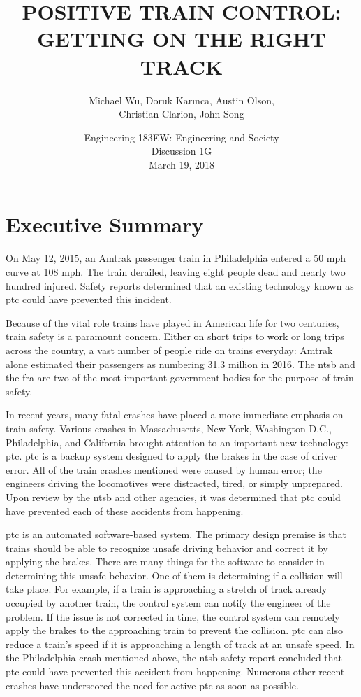 \documentclass[11pt, titlepage]{article}
\title{POSITIVE TRAIN CONTROL: GETTING ON THE RIGHT TRACK}
\author{Michael Wu, Doruk Karınca, Austin Olson,\\Christian Clarion, John Song}
\date{Engineering 183EW: Engineering and Society \\ Discussion 1G \\ March 19, 2018}
\newcommand\frontmatter{
    \cleardoublepage
  \pagenumbering{roman}}
\newcommand\mainmatter{
    \cleardoublepage
  \pagenumbering{arabic}}
\begin{document}
\maketitle

\frontmatter
\tableofcontents
\listoffigures
\listoftables

\mainmatter
\section{Executive Summary}

On May 12, 2015, an Amtrak passenger train in Philadelphia entered a 50 mph
curve at 108 mph. The train derailed, leaving eight people dead and nearly two
hundred injured. Safety reports determined that an existing technology known
as \gls{ptc} could have prevented this incident.

Because of the vital role trains have played in American life for two
centuries, train safety is a paramount concern. Either on short trips to work
or long trips across the country, a vast number of people ride on trains
everyday: Amtrak alone estimated their passengers as numbering 31.3 million in
2016. The \gls{ntsb} and the \gls{fra} are two of the most
important government bodies for the purpose of train safety.

In recent years, many fatal crashes have placed a more immediate emphasis on
train safety. Various crashes in Massachusetts, New York, Washington D.C.,
Philadelphia, and California brought attention to an important new technology:
\gls{ptc}. \gls{ptc} is a backup system designed to apply the brakes in the
case of driver error. All of the train crashes mentioned were caused by human
error; the engineers driving the locomotives were distracted, tired, or simply
unprepared. Upon review by the \gls{ntsb} and other agencies, it was
determined that \gls{ptc} could have prevented each of these accidents from
happening.

\gls{ptc} is an automated software-based system. The primary design premise is
that trains should be able to recognize unsafe driving behavior and correct it
by applying the brakes. There are many things for the software to consider in
determining this unsafe behavior. One of them is determining if a collision
will take place. For example, if a train is approaching a stretch of track
already occupied by another train, the control system can notify the engineer
of the problem. If the issue is not corrected in time, the control system can
remotely apply the brakes to the approaching train to prevent the collision.
\gls{ptc} can also reduce a train’s speed if it is approaching a length of
track at an unsafe speed. In the Philadelphia crash mentioned above, the
\gls{ntsb} safety report concluded that \gls{ptc} could have prevented this
accident from happening. Numerous other recent crashes have underscored the need
for active \gls{ptc} as soon as possible.
\end{document}
